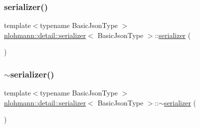 \mbox{\label{classnlohmann_1_1detail_1_1serializer_a28081304e70cca6b3042c101ee5c498c}} 
\subsubsection{\texorpdfstring{serializer()}{serializer()}\hspace{0.1cm}{\footnotesize\ttfamily [3/3]}}
{\footnotesize\ttfamily template$<$typename Basic\+Json\+Type $>$ \\
\mbox{\hyperlink{classnlohmann_1_1detail_1_1serializer}{nlohmann\+::detail\+::serializer}}$<$ Basic\+Json\+Type $>$\+::\mbox{\hyperlink{classnlohmann_1_1detail_1_1serializer}{serializer}} (\begin{DoxyParamCaption}\item[{\mbox{\hyperlink{classnlohmann_1_1detail_1_1serializer}{serializer}}$<$ Basic\+Json\+Type $>$ \&\&}]{ }\end{DoxyParamCaption})\hspace{0.3cm}{\ttfamily [delete]}}

\mbox{\label{classnlohmann_1_1detail_1_1serializer_aa6c62b51cbebb185307df851dc0167f0}} 
\subsubsection{\texorpdfstring{$\sim$serializer()}{~serializer()}}
{\footnotesize\ttfamily template$<$typename Basic\+Json\+Type $>$ \\
\mbox{\hyperlink{classnlohmann_1_1detail_1_1serializer}{nlohmann\+::detail\+::serializer}}$<$ Basic\+Json\+Type $>$\+::$\sim$\mbox{\hyperlink{classnlohmann_1_1detail_1_1serializer}{serializer}} (\begin{DoxyParamCaption}{ }\end{DoxyParamCaption})\hspace{0.3cm}{\ttfamily [default]}}



